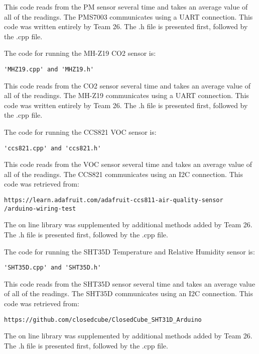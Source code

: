 \documentclass[12pt,letterpaper,titlepage]{article}
\begin{document}
This code reads from the PM sensor several time and takes an average value of all of the readings. The PMS7003 communicates using a UART connection. This code was written entirely by Team 26. The .h file is presented first, followed by the .cpp file.


The code for running the MH-Z19 CO2 sensor is:
\begin{verbatim}
'MHZ19.cpp' and 'MHZ19.h'
\end{verbatim}
This code reads from the CO2 sensor several time and takes an average value of all of the readings. The MH-Z19 communicates using a UART connection. This code was written entirely by Team 26. The .h file is presented first, followed by the .cpp file.


The code for running the CCS821 VOC sensor is:
\begin{verbatim}
'ccs821.cpp' and 'ccs821.h'
\end{verbatim}
This code reads from the VOC sensor several time and takes an average value of all of the readings. The CCS821 communicates using an I2C connection. This code was retrieved from:
\begin{verbatim}
https://learn.adafruit.com/adafruit-ccs811-air-quality-sensor
/arduino-wiring-test
\end{verbatim}
The on line library was supplemented by additional methods added by Team 26. The .h file is presented first, followed by the .cpp file.


The code for running the SHT35D Temperature and Relative Humidity sensor is:
\begin{verbatim}
'SHT35D.cpp' and 'SHT35D.h'
\end{verbatim}
This code reads from the SHT35D sensor several time and takes an average value of all of the readings. The SHT35D communicates using an I2C connection. This code was retrieved from:
\begin{verbatim}
https://github.com/closedcube/ClosedCube_SHT31D_Arduino
\end{verbatim}
The on line library was supplemented by additional methods added by Team 26. The .h file is presented first, followed by the .cpp file.

\end{document}
